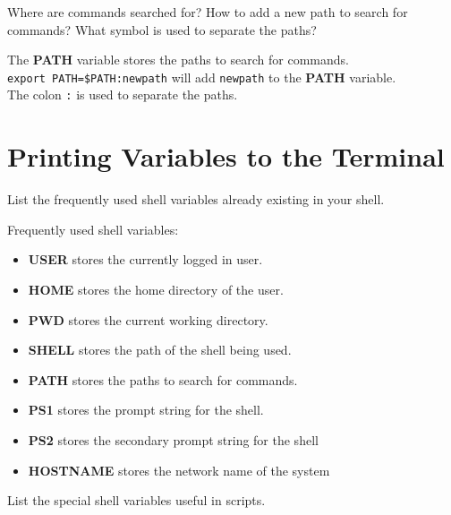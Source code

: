 \begin{qs}
  Where are commands searched for? How to add a new path to search for commands?
  What symbol is used to separate the paths?
\end{qs}

\begin{ans}
  The \textbf{PATH} variable stores the paths to search for commands. \\
  \texttt{export PATH=\$PATH:newpath} will add \texttt{newpath} to the \textbf{PATH} variable.\\
  The colon \texttt{:} is used to separate the paths.
\end{ans}

\section{Printing Variables to the Terminal}

\begin{qs}
  List the frequently used shell variables already existing in your shell.
\end{qs}

\begin{ans}
  Frequently used shell variables:
  \begin{itemize}
    \item \textbf{USER} stores the currently logged in user.
    \item \textbf{HOME} stores the home directory of the user.
    \item \textbf{PWD} stores the current working directory.
    \item \textbf{SHELL} stores the path of the shell being used.
    \item \textbf{PATH} stores the paths to search for commands.
    \item \textbf{PS1} stores the prompt string for the shell.
    \item \textbf{PS2} stores the secondary prompt string for the shell
    \item \textbf{HOSTNAME} stores the network name of the system
  \end{itemize}
\end{ans}

\begin{qs}
  List the special shell variables useful in scripts.
\end{qs}

